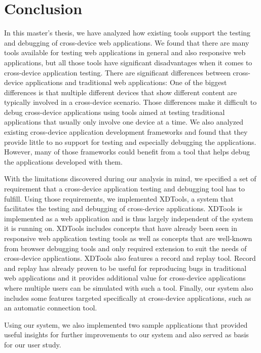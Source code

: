 \chapter{Conclusion}

In this master's thesis, we have analyzed how existing tools support the testing and debugging of cross-device web applications. We found that there are many tools available for testing web applications in general and also responsive web applications, but all those tools have significant disadvantages when it comes to cross-device application testing. There are significant differences between cross-device applications and traditional web applications: One of the biggest differences is that multiple different devices that show different content are typically involved in a cross-device scenario. Those differences make it difficult to debug cross-device applications using tools aimed at testing traditional applications that usually only involve one device at a time. We also analyzed existing cross-device application development frameworks and found that they provide little to no support for testing and especially debugging the applications. However, many of those frameworks could benefit from a tool that helps debug the applications developed with them.

With the limitations discovered during our analysis in mind, we specified a set of requirement that a cross-device application testing and debugging tool has to fulfill. Using those requirements, we implemented XDTools, a system that facilitates the testing and debugging of cross-device applications. XDTools is implemented as a web application and is thus largely independent of the system it is running on. XDTools includes concepts that have already been seen in responsive web application testing tools as well as concepts that are well-known from browser debugging tools and only required extension to suit the needs of cross-device applications. XDTools also features a record and replay tool. Record and replay has already proven to be useful for reproducing bugs in traditional web applications and it provides additional value for cross-device applications where multiple users can be simulated with such a tool. Finally, our system also includes some features targeted specifically at cross-device applications, such as an automatic connection tool. 

Using our system, we also implemented two sample applications that provided useful insights for further improvements to our system and also served as basis for our user study. 

